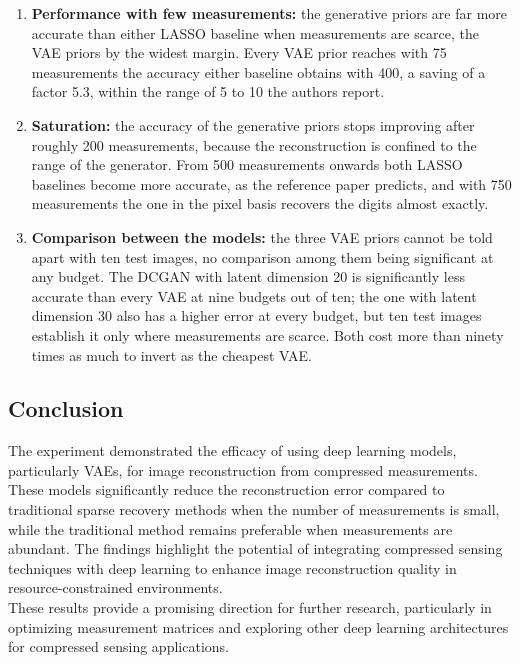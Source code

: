 \begin{enumerate}
    \item \textbf{Performance with few measurements:} the generative priors are far more accurate than either LASSO baseline when measurements are scarce, the VAE priors by the widest margin. Every VAE prior reaches with 75 measurements the accuracy either baseline obtains with 400, a saving of a factor 5.3, within the range of 5 to 10 the authors report.
    \item \textbf{Saturation:} the accuracy of the generative priors stops improving after roughly 200 measurements, because the reconstruction is confined to the range of the generator. From 500 measurements onwards both LASSO baselines become more accurate, as the reference paper predicts, and with 750 measurements the one in the pixel basis recovers the digits almost exactly.
    \item \textbf{Comparison between the models:} the three VAE priors cannot be told apart with ten test images, no comparison among them being significant at any budget. The DCGAN with latent dimension 20 is significantly less accurate than every VAE at nine budgets out of ten; the one with latent dimension 30 also has a higher error at every budget, but ten test images establish it only where measurements are scarce. Both cost more than ninety times as much to invert as the cheapest VAE.
\end{enumerate}

\subsection{Conclusion}

The experiment demonstrated the efficacy of using deep learning models, particularly VAEs, for image reconstruction from compressed measurements. These models significantly reduce the reconstruction error compared to traditional sparse recovery methods when the number of measurements is small, while the traditional method remains preferable when measurements are abundant. The findings highlight the potential of integrating compressed sensing techniques with deep learning to enhance image reconstruction quality in resource-constrained environments.
\\
These results provide a promising direction for further research, particularly in optimizing measurement matrices and exploring other deep learning architectures for compressed sensing applications.
